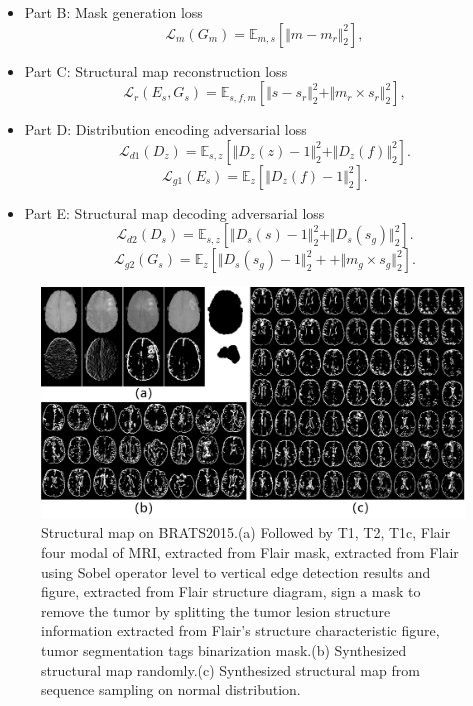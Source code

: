 \documentclass[runningheads]{llncs}
\begin{document}
	\begin{itemize}
		\item{Part B: Mask generation loss}
		\begin{equation}
		\mathcal{L}_{m}(G_m)=\mathbb{E}_{m,s}[\Vert{m-m_r}\Vert_{2}^{2}],
		\end{equation}
		\item{Part C: Structural map reconstruction loss} 
		\begin{equation}
		\mathcal{L}_{r}(E_s,G_s)=\mathbb{E}_{s,f,m}[\Vert{s-s_r}\Vert_{2}^{2}+\Vert{m_r\times s_r}\Vert_{2}^{2}],
		\end{equation}
		\item{Part D: Distribution encoding adversarial loss} 
		\begin{equation}
		\mathcal{L}_{d1}(D_{z})=\mathbb{E}_{s,z}[\Vert{D_{z}(z)-1}\Vert_{2}^{2}+\Vert{D_{z}(f)}\Vert_{2}^{2}].
		\end{equation}
		\begin{equation}
		\mathcal{L}_{g1}(E_s)=\mathbb{E}_{z}[\Vert{D_{z}(f)-1}\Vert_{2}^{2}].	
		\end{equation}
		\item{Part E: Structural map decoding adversarial loss} 
		\begin{equation}
		\mathcal{L}_{d2}(D_{s})=\mathbb{E}_{s,z}[\Vert{D_{s}(s)-1}\Vert_{2}^{2}+\Vert{D_{s}(s_g)}\Vert_{2}^{2}].
		\end{equation}
		\begin{equation}
		\mathcal{L}_{g2}(G_s)=\mathbb{E}_{z}[\Vert{D_{s}(s_g)-1}\Vert_{2}^{2}++\Vert{m_g\times s_g}\Vert_{2}^{2}].	
		\end{equation}
	\end{itemize}
	\begin{figure}[thbp!]
		\centering
		\includegraphics[width=0.85\linewidth]{figures/brats_f}
		\caption{Structural map on BRATS2015.(a) Followed by T1, T2, T1c, Flair four modal of MRI, extracted from Flair mask, extracted from Flair using Sobel operator level to vertical edge detection results and figure, extracted from Flair structure diagram, sign a mask to remove the tumor by splitting the tumor lesion structure information extracted from Flair's structure characteristic figure, tumor segmentation tags binarization mask.(b) Synthesized structural map randomly.(c) Synthesized structural map from sequence sampling on normal distribution.}
		\label{generated_f}
	\end{figure}
\end{document}
